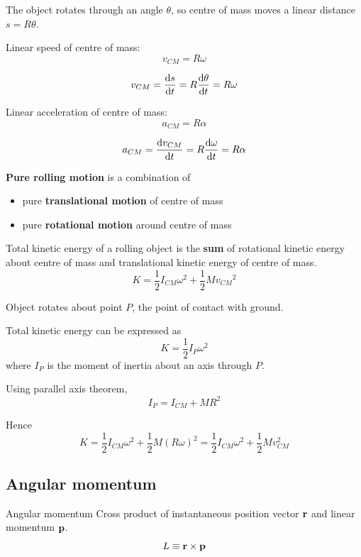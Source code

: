 The object rotates through an angle $\theta$, so centre of mass moves a linear distance $s=R\theta$. 

Linear speed of centre of mass:
\begin{equation}
v_{CM} = R\omega
\end{equation}
\begin{derivation}
\[ v_{CM} = \odv{s}{t} = R\odv{\theta}{t} = R\omega \]
\end{derivation}

Linear acceleration of centre of mass:
\begin{equation}
a_{CM} = R\alpha
\end{equation}
\begin{derivation}
\[ a_{CM} = \odv{v_{CM}}{t} = R\odv{\omega}{t} = R\alpha \]
\end{derivation}

\textbf{Pure rolling motion} is a combination of 
\begin{itemize}
\item pure \textbf{translational motion} of centre of mass
\item pure \textbf{rotational motion} around centre of mass
\end{itemize}

Total kinetic energy of a rolling object is the \textbf{sum} of rotational kinetic energy about centre of mass and translational kinetic energy of centre of mass.
\begin{equation}
K = \frac{1}{2}I_{CM}\omega^2 + \frac{1}{2}M{v_{CM}}^2
\end{equation}
\begin{derivation}
Object rotates about point $P$, the point of contact with ground.

Total kinetic energy can be expressed as
\[ K=\frac{1}{2}I_P\omega^2 \]
where $I_P$ is the moment of inertia about an axis through $P$.

Using parallel axis theorem,
\[ I_P = I_{CM} + MR^2 \]

Hence 
\[ K = \frac{1}{2}I_{CM}\omega^2 + \frac{1}{2}M(R\omega)^2 = \boxed{\frac{1}{2}I_{CM}\omega^2 + \frac{1}{2}Mv_{CM}^2} \]
\end{derivation}
\pagebreak

\subsection{Angular momentum}
\begin{defn}{Angular momentum}{}
Cross product of instantaneous position vector $\vb{r}$ and linear momentum $\vb{p}$.
\begin{equation}
L \equiv \vb{r} \times \vb{p}
\end{equation}
\end{defn}

